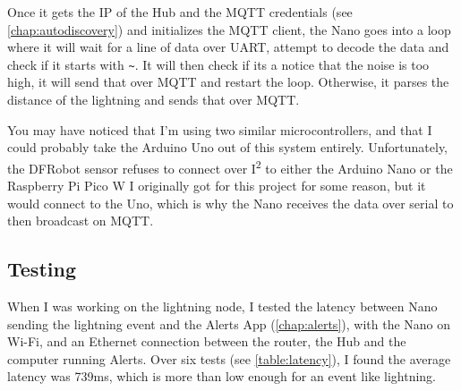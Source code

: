 Once it gets the IP of the Hub and the MQTT credentials (see \autoref{chap:autodiscovery}) and initializes the MQTT client, the Nano goes into a loop where it will wait for a line of data over UART, attempt to decode the data and check if it starts with \texttt{\~{}}. It will then check if its a notice that the noise is too high, it will send that over MQTT and restart the loop. Otherwise, it parses the distance of the lightning and sends that over MQTT.

You may have noticed that I'm using two similar microcontrollers, and that I could probably take the Arduino Uno out of this system entirely. Unfortunately, the DFRobot sensor refuses to connect over I\textsuperscript{2} to either the Arduino Nano or the Raspberry Pi Pico W I originally got for this project for some reason, but it would connect to the Uno, which is why the Nano receives the data over serial to then broadcast on MQTT.

\subsection{Testing}
When I was working on the lightning node, I tested the latency between Nano sending the lightning event and the Alerts App (\autoref{chap:alerts}), with the Nano on Wi-Fi, and an Ethernet connection between the router, the Hub and the computer running Alerts. Over six tests (see \autoref{table:latency}), I found the average latency was 739ms, which is more than low enough for an event like lightning. 

\latencydata


